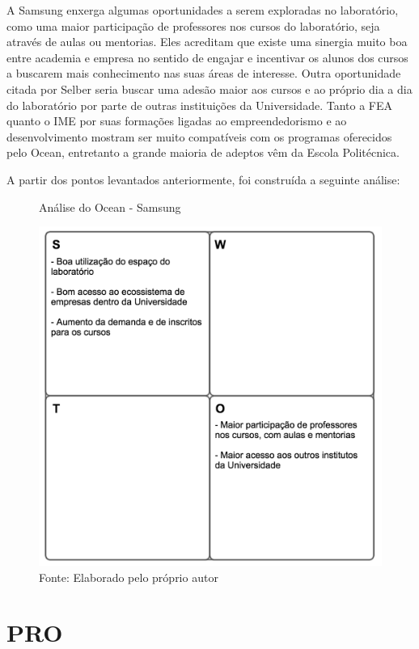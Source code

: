 A Samsung enxerga algumas oportunidades a serem exploradas no laboratório, como uma maior participação de professores nos cursos do laboratório, seja através de aulas ou mentorias. Eles acreditam que existe uma sinergia muito boa entre academia e empresa no sentido de engajar e incentivar os alunos dos cursos a buscarem mais conhecimento nas suas áreas de interesse. Outra oportunidade citada por Selber seria buscar uma adesão maior aos cursos e ao próprio dia a dia do laboratório por parte de outras instituições da Universidade. Tanto a FEA quanto o IME por suas formações ligadas ao empreendedorismo e ao desenvolvimento mostram ser muito compatíveis com os programas oferecidos pelo Ocean, entretanto a grande maioria de adeptos vêm da Escola Politécnica.

A partir dos pontos levantados anteriormente, foi construída a seguinte análise:

\begin{figure}[H]
\caption{Análise do Ocean - Samsung}
\centerline{\includegraphics[scale=0.75]{img/samsungswot}}
\label{fig:swotsamsung}
\caption* {Fonte: Elaborado pelo próprio autor}
\end{figure}

\section{PRO}

